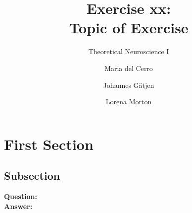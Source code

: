 \documentclass{scrartcl}
\title{Exercise xx:\\Topic of Exercise}
\subtitle{Theoretical Neuroscience I}
\author{Maria del Cerro \and Johannes G\"atjen \and Lorena Morton}
\newcommand\Question{%
  \textbf{Question:}%
}
\newcommand\Answer{%
  \textbf{Answer:}%
}
\begin{document}
\maketitle
\section{First Section}
\subsection{Subsection}
\Question\\
\Answer\\

\end{document}
